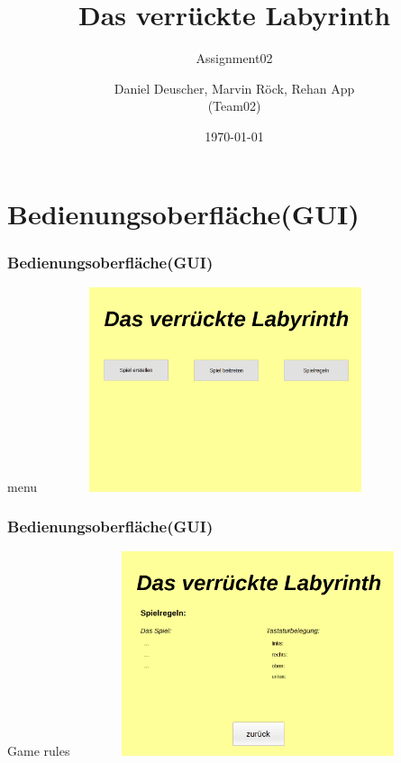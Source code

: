 \documentclass{beamer}
\begin{document}
	\title[]{Das verrückte Labyrinth}	
	\subtitle{Assignment02}
	\author{Daniel Deuscher, Marvin Röck, Rehan App\\ (Team02)}
	\date{\today}
	 
	\begin{frame}
		\maketitle
	\end{frame}
	 
	\section{Bedienungsoberfläche(GUI)}
	    \label{Frame1}	
		\begin{frame}
			\frametitle{Bedienungsoberfläche(GUI)}
			\begin{block}{menu}
				\includegraphics[width = 10.8cm, height = 6cm]{BilderGUI/01-titelpage.png}
			\end{block}		
		\end{frame}

	    \label{Frame2}	
		\begin{frame}
			\frametitle{Bedienungsoberfläche(GUI)}
			\begin{block}{Game rules}
				\includegraphics[width = 10.8cm, height = 6cm]{BilderGUI/02-spielregeln.png}
			\end{block}		
		\end{frame}
\end{document}
